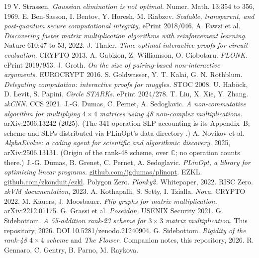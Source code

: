 \documentclass[10pt]{article}
\begin{document}
\begin{thebibliography}{19}
 V. Strassen. \emph{Gaussian elimination is not
  optimal.} Numer. Math. 13:354 to 356, 1969.
 E. Ben-Sasson, I. Bentov, Y. Horesh, M. Riabzev.
  \emph{Scalable, transparent, and post-quantum secure computational
  integrity.} ePrint 2018/046.
 A. Fawzi et al. \emph{Discovering faster matrix
  multiplication algorithms with reinforcement learning.} Nature
  610:47 to 53, 2022.
 J. Thaler. \emph{Time-optimal interactive proofs for
  circuit evaluation.} CRYPTO 2013.
 A. Gabizon, Z. Williamson, O. Ciobotaru.
  \emph{PLONK.} ePrint 2019/953.
 J. Groth. \emph{On the size of pairing-based
  non-interactive arguments.} EUROCRYPT 2016.
 S. Goldwasser, Y. T. Kalai, G. N. Rothblum.
  \emph{Delegating computation: interactive proofs for muggles.}
  STOC 2008.
 U. Hab\"ock, D. Levit, S. Papini. \emph{Circle
  STARKs.} ePrint 2024/278.
 T. Liu, X. Xie, Y. Zhang. \emph{zkCNN.} CCS 2021.
 J.-G. Dumas, C. Pernet, A. Sedoglavic. \emph{A
  non-commutative algorithm for multiplying $4{\times}4$ matrices
  using 48 non-complex multiplications.} arXiv:2506.13242 (2025).
  (The 341-operation SLP accounting is its Appendix~B; scheme and
  SLPs distributed via PLinOpt's data directory \cite{plinopt}.)
 A. Novikov et al. \emph{AlphaEvolve: a
  coding agent for scientific and algorithmic discovery.} 2025,
  arXiv:2506.13131. (Origin of the rank-48 scheme, over
  $\mathbb{C}$; no operation counts there.)
 J.-G. Dumas, B. Grenet, C. Pernet,
  A. Sedoglavic. \emph{PLinOpt, a library for optimizing linear
  programs.} \url{github.com/jgdumas/plinopt}.
 EZKL. \url{github.com/zkonduit/ezkl}.
 Polygon Zero. \emph{Plonky2.} Whitepaper, 2022.
 RISC Zero. \emph{zkVM documentation}, 2023.
 A. Kothapalli, S. Setty, I. Tzialla. \emph{Nova.}
  CRYPTO 2022.
 M. Kauers, J. Moosbauer. \emph{Flip graphs for matrix
  multiplication.} arXiv:2212.01175.
 G. Grassi et al. \emph{Poseidon.} USENIX Security
  2021.
 G. Sidebottom. \emph{A 55-addition rank-23 scheme for
  $3\times3$ matrix multiplication.} This repository, 2026. DOI
  10.5281/zenodo.21240904.
 G. Sidebottom. \emph{Rigidity of the rank-48
  $4\times4$ scheme} and \emph{The Flower.} Companion notes, this
  repository, 2026.
 R. Gennaro, C. Gentry, B. Parno, M. Raykova.

\end{thebibliography}
\end{document}
